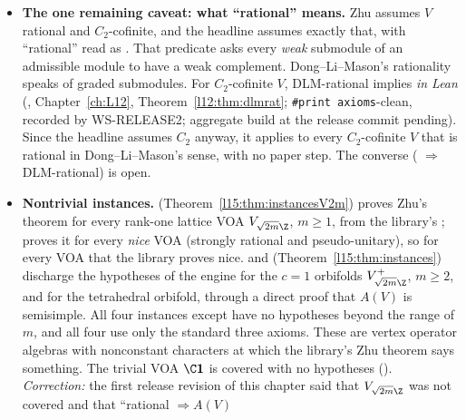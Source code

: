 \begin{itemize}
  (), and the family is the canonical one, so no family data are assumed. The theorem is
  \texttt{\#print axioms}-clean (the standard three axioms) and uses the PBW theorem , which is a theorem.
  It covers \emph{one-point functions} only, not the $n$-point functions on the torus. This is Zhu's modular-invariance
  theorem for one-point functions (Zhu 1996, Theorem~5.3.3; Gannon's Theorem~5.3.8), with $\rho$ attached to the actual
  modules (``pinned'').
\item \textbf{The one remaining caveat: what ``rational'' means.} Zhu assumes $V$ rational and $C_2$-cofinite, and the
  headline assumes exactly that, with ``rational'' read as . That predicate asks every \emph{weak}
  submodule of an admissible module to have a weak complement. Dong--Li--Mason's rationality speaks of graded submodules.
  For $C_2$-cofinite $V$, DLM-rational implies  \emph{in Lean}
  (, Chapter~\ref{ch:L12},
  Theorem~\ref{l12:thm:dlmrat}; \texttt{\#print axioms}-clean, recorded by WS-RELEASE2; aggregate build at the release
  commit pending). Since the headline assumes $C_2$ anyway, it applies to every $C_2$-cofinite $V$ that is rational in
  Dong--Li--Mason's sense, with no paper step. The converse ( $\Rightarrow$ DLM-rational) is open.
\item \textbf{Nontrivial instances.}  (Theorem~\ref{l15:thm:instancesV2m}) proves Zhu's theorem for
  every rank-one lattice VOA $V_{\sqrt{2m}\Z}$, $m\ge1$, from the library's ;
   proves it for every \emph{nice} VOA (strongly rational and pseudo-unitary), so for every VOA
  that the library proves nice.  and 
  (Theorem~\ref{l15:thm:instances}) discharge the hypotheses of the engine for the $c=1$ orbifolds $V_{\sqrt{2m}\Z}^+$,
  $m\ge2$, and for the tetrahedral orbifold, through a direct proof that $A(V)$ is semisimple. All four instances except
   have no hypotheses beyond the range of $m$, and all four use only the standard three axioms. These are vertex
  operator algebras with nonconstant characters at which the library's Zhu theorem says something. The trivial VOA
  $\C\lfifteenvac$ is covered with no hypotheses (). \emph{Correction:} the first
  release revision of this chapter said that $V_{\sqrt{2m}\Z}$ was not covered and that ``rational $\Rightarrow A(V)$

\end{itemize}
